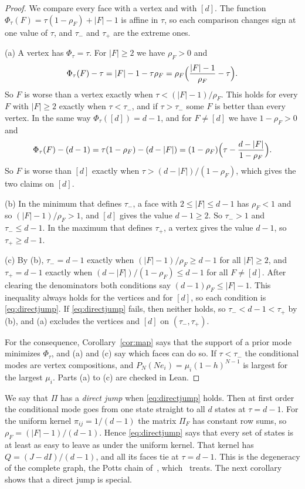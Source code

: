 \begin{proof}
We compare every face with a vertex and with $[d]$. The function
$\Phi_\tau(F)=\tau(1-\rho_F)+|F|-1$ is affine in $\tau$, so each comparison
changes sign at one value of $\tau$, and $\tau_-$ and $\tau_+$ are the extreme
ones.

(a) A vertex has $\Phi_\tau=\tau$. For $|F|\ge2$ we have $\rho_F>0$ and
\[
 \Phi_\tau(F)-\tau=|F|-1-\tau\rho_F=\rho_F\Bigl(\frac{|F|-1}{\rho_F}-\tau\Bigr).
\]
So $F$ is worse than a vertex exactly when $\tau<(|F|-1)/\rho_F$. This holds
for every $F$ with $|F|\ge2$ exactly when $\tau<\tau_-$, and if $\tau>\tau_-$
some $F$ is better than every vertex. In the same way $\Phi_\tau([d])=d-1$,
and for $F\ne[d]$ we have $1-\rho_F>0$ and
\[
 \Phi_\tau(F)-(d-1)=\tau(1-\rho_F)-(d-|F|)
 =(1-\rho_F)\Bigl(\tau-\frac{d-|F|}{1-\rho_F}\Bigr).
\]
So $F$ is worse than $[d]$ exactly when $\tau>(d-|F|)/(1-\rho_F)$, which gives
the two claims on $[d]$.

(b) In the minimum that defines $\tau_-$, a face with $2\le|F|\le d-1$ has
$\rho_F<1$ and so $(|F|-1)/\rho_F>1$, and $[d]$ gives the value $d-1\ge2$. So
$\tau_->1$ and $\tau_-\le d-1$. In the maximum that defines $\tau_+$, a vertex
gives the value $d-1$, so $\tau_+\ge d-1$.

(c) By (b), $\tau_-=d-1$ exactly when $(|F|-1)/\rho_F\ge d-1$ for all
$|F|\ge2$, and $\tau_+=d-1$ exactly when $(d-|F|)/(1-\rho_F)\le d-1$ for all
$F\ne[d]$. After clearing the denominators both conditions say
$(d-1)\rho_F\le|F|-1$. This inequality always holds for the vertices and for
$[d]$, so each condition is \eqref{eq:directjump}. If
\eqref{eq:directjump} fails, then neither holds, so $\tau_-<d-1<\tau_+$ by
(b), and (a) excludes the vertices and $[d]$ on $(\tau_-,\tau_+)$.

For the consequence, Corollary~\ref{cor:map} says that the support of a prior
mode minimizes $\Phi_\tau$, and (a) and (c) say which faces can do so. If
$\tau<\tau_-$ the conditional modes are vertex compositions, and
$P_N(Ne_i)=\mu_i(1-h)^{N-1}$ is largest for the largest $\mu_i$. Parts (a) to
(c) are checked in Lean.
\end{proof}

We say that $\Pi$ has a \emph{direct jump} when \eqref{eq:directjump} holds.
Then at first order the conditional mode goes from one state straight to all $d$ states at
$\tau=d-1$. For the uniform kernel $\pi_{ij}=1/(d-1)$ the matrix $\Pi_F$ has
constant row sums, so $\rho_F=(|F|-1)/(d-1)$. Hence
\eqref{eq:directjump} says that every set of states is at least as easy to
leave as under the uniform kernel. That kernel has $Q=(J-dI)/(d-1)$, and all its faces tie at
$\tau=d-1$. This is the degeneracy of the complete graph, the Potts chain of~\cite{paperB}, which~\cite[Section~\ref*{C-sec:complete}]{paperC} treats.
The next corollary shows that a direct jump is special.

